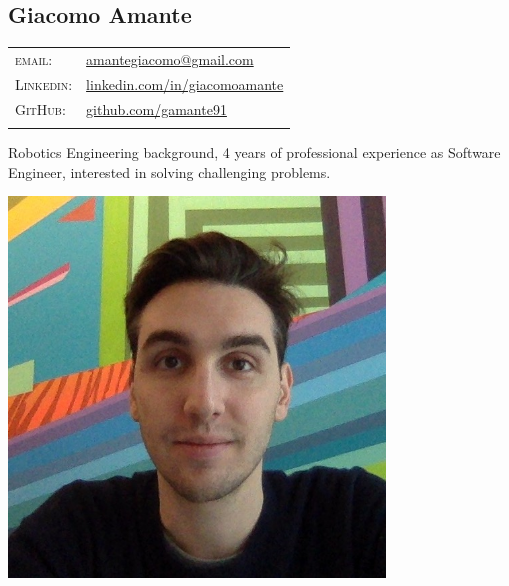 \documentclass[a4paper,10pt]{article}
\begin{document}
   \pagestyle{empty}

   \begin{minipage}{0.75\textwidth}
      \vspace{-10mm}
      \begin{flushleft}
         \section{\Huge Giacomo Amante}
         \vspace{2mm}
         \begin{tabular}{ll}
            \textsc{email:} & \href{mailto:amantegiacomo@gmail.com}{amantegiacomo@gmail.com} \\
            \textsc{Linkedin:} & 
            \href{http://www.linkedin.com/in/giacomoamante}{\color{black}linkedin.com/in/giacomoamante}\\
            \textsc{GitHub:} & \href{https://github.com/gamante91}{github.com/gamante91}\\
            \multicolumn{2}{c}{} \\
         \end{tabular}
      \end{flushleft}
      Robotics Engineering background, 4 years of professional experience as Software Engineer, interested in solving challenging problems.
   \end{minipage}
   \begin{minipage}[c]{0.25\textwidth}
      \begin{center}
         \includegraphics[width=0.75\textwidth]{resources/GiacomoAmante_lowres.jpg}
      \end{center}
   \end{minipage}
\end{document}
